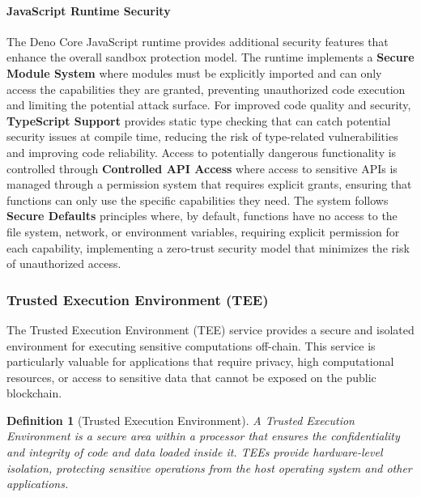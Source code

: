 \documentclass[11pt]{article}
\newtheorem{definition}{Definition}
\begin{document}
\paragraph{JavaScript Runtime Security}
The Deno Core JavaScript runtime provides additional security features that enhance the overall sandbox protection model. The runtime implements a \textbf{Secure Module System} where modules must be explicitly imported and can only access the capabilities they are granted, preventing unauthorized code execution and limiting the potential attack surface. For improved code quality and security, \textbf{TypeScript Support} provides static type checking that can catch potential security issues at compile time, reducing the risk of type-related vulnerabilities and improving code reliability. Access to potentially dangerous functionality is controlled through \textbf{Controlled API Access} where access to sensitive APIs is managed through a permission system that requires explicit grants, ensuring that functions can only use the specific capabilities they need. The system follows \textbf{Secure Defaults} principles where, by default, functions have no access to the file system, network, or environment variables, requiring explicit permission for each capability, implementing a zero-trust security model that minimizes the risk of unauthorized access.

\subsubsection{Trusted Execution Environment (TEE)}
\label{subsubsec:tee}

The Trusted Execution Environment (TEE) service provides a secure and isolated environment for executing sensitive computations off-chain. This service is particularly valuable for applications that require privacy, high computational resources, or access to sensitive data that cannot be exposed on the public blockchain.



\begin{definition}[Trusted Execution Environment]
A Trusted Execution Environment is a secure area within a processor that ensures the confidentiality and integrity of code and data loaded inside it. TEEs provide hardware-level isolation, protecting sensitive operations from the host operating system and other applications.
\end{definition}
\end{document}
